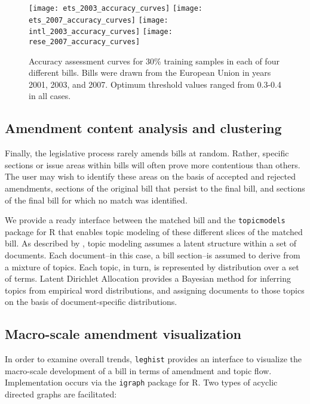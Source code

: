 \documentclass[11pt]{article}
\begin{document}
\begin{figure}[ht]
  \centering
  \texttt{[image: ets\_2003\_accuracy\_curves]}
  \texttt{[image: ets\_2007\_accuracy\_curves]}
  \texttt{[image: intl\_2003\_accuracy\_curves]}
  \texttt{[image: rese\_2007\_accuracy\_curves]}
  \caption{Accuracy assessment curves for 30\% training samples in
    each of four different bills. Bills were drawn from the European
    Union in years 2001, 2003, and 2007. Optimum threshold values
    ranged from 0.3-0.4 in all cases.}
  \label{fig:bill-accuracy-curves}
\end{figure}

\subsection{Amendment content analysis and clustering}
\label{sec:amendm-cont-analys}

Finally, the legislative process rarely amends bills at
random. Rather, specific sections or issue areas within bills will
often prove more contentious than others. The user may wish to
identify these areas on the basis of accepted and rejected amendments,
sections of the original bill that persist to the final bill, and
sections of the final bill for which no match was identified. 

We provide a ready interface between the matched bill and the
\texttt{topicmodels} package for R that enables topic modeling of
these different slices of the matched bill. As described by
\cite{blei2003latent}, topic modeling assumes a latent
structure within a set of documents. Each document--in this case, a
bill section--is assumed to derive from a mixture of topics. Each
topic, in turn, is represented by distribution over a
set of terms. Latent Dirichlet Allocation provides a Bayesian method
for inferring topics from empirical word distributions, and assigning
documents to those topics on the basis of document-specific
distributions. 

\subsection{Macro-scale amendment visualization}
\label{sec:macro-scale-vis}

In order to examine overall trends, \texttt{leghist} provides an interface to visualize the macro-scale development of a bill in terms of amendment and topic flow. Implementation occurs via the \texttt{igraph} package for R. Two types of acyclic directed graphs are facilitated:
\end{document}
